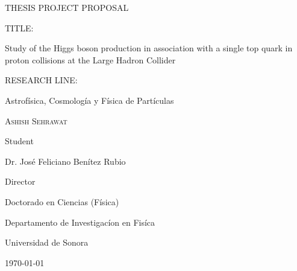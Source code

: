 \documentclass[final,3p]{CSP}
\def\Student{Ashish Sehrawat}
\def\Title{THESIS PROJECT PROPOSAL}
\def\Prog{Doctorado en Ciencias (F\'{i}sica) }
\def\Dept{Departamento de Investigac\'{i}on en Fis\'{i}ca}
\def\Director{Dr. Jos\'{e} Feliciano Ben\'{i}tez Rubio}
\def\ProjectTitle{Study of the Higgs boson production in association with a single top quark in proton collisions at the Large Hadron Collider}
\def\ResearchLine{Astrof\'{i}sica, Cosmolog\'{i}a y F\'{i}sica de Part\'{i}culas}
\begin{document}
\begin{titlepage}
  \centering
  \hspace{0pt}
  \vfill
        {\scshape\Large \Title \par}

	\vspace{2cm}
        \begin{adjustwidth}{2cm}{2cm}{
            TITLE:\par
            {\large \ProjectTitle \par}
          }
        \end{adjustwidth}

	\vspace{0.5cm}
        \begin{adjustwidth}{2cm}{2cm}{
            RESEARCH LINE: \par
            \ResearchLine \par}
        \end{adjustwidth}

        
        \vspace{4cm}
        {\underline{\hspace{8cm}}\par}
	{\scshape\large \Student \par}
        {Student\par}

        \vspace{1cm}
        {\underline{\hspace{8cm}}\par}
	{\Director \par}
        {Director\par}

        \vspace{1cm}
        {\Prog \par}
        {\Dept \par}
        {Universidad de Sonora \par}

        \vspace{4cm}
	{\today}

\hspace{0pt}
\vfill

\end{titlepage}


\shipout\null


\newpage
\hspace{2pt}
\vfill
\end{document}
